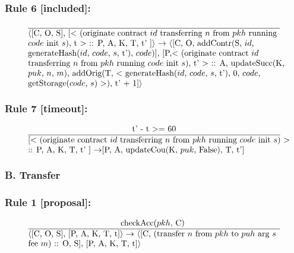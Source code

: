 \documentclass[a4paper]{llncs}
\begin{document}
\subsubsection*{Rule 6 [included]:}
\begin{equation}{}
\frac{}{\parbox{4.2in}{\text{$\langle$[C, O, S], [$<$ (originate contract ${id}$ transferring  ${n}$ from ${pkh}$ running } \\
\text{${code}$ init ${s}$), t $>$ :: P, A, K, T, t' ]$\rangle$ $\rightarrow$ $\langle$[C, O, addContr(S, $id$, } \\
\text{generateHash($id$, $code$, $s$, t'), $code$)], [P,$<$ (originate contract ${id}$ } \\
\text{transferring  ${n}$ from ${pkh}$ running ${code}$ init ${s}$), t' $>$ :: A, updateSucc(K, } \\
\text{$puk$, $n$, $m$), addOrig(T, $<$ generateHash($id$, $code$, $s$, t'), $0$, $code$, } \\
 \text{getStorage($code$, $s$) $>$), t' + 1]$\rangle$}}} 
\end{equation}

\subsubsection*{Rule 7 [timeout]:}
\begin{equation}{}
\frac{\text{t' - t $>=$ 60}}{\parbox{4.2in}{\text{[$<$ (originate contract ${id}$ transferring  ${n}$ from ${pkh}$ running ${code}$ init ${s}$) $>$ } \\
\text{:: P, A, K, T, t' ] $\rightarrow$[P, A, updateCou(K, $puk$, False), T, t']}}} 
\end{equation}

\subsubsection*{B. Transfer}

\subsubsection*{Rule 1 [proposal]:}

\begin{equation}{}
\frac{\text{checkAcc($pkh$, C)  }}{\parbox{4.2in}{\text{$\langle$[C, O, S], [P, A, K, T, t]$\rangle$ $\rightarrow$ $\langle$[C, (transfer ${n}$ from ${pkh}$ to  ${puh}$ arg ${s}$ }  \\
\text{fee ${m}$) :: O, S], [P, A, K, T, t]$\rangle$}}} 
\end{equation}
\end{document}
